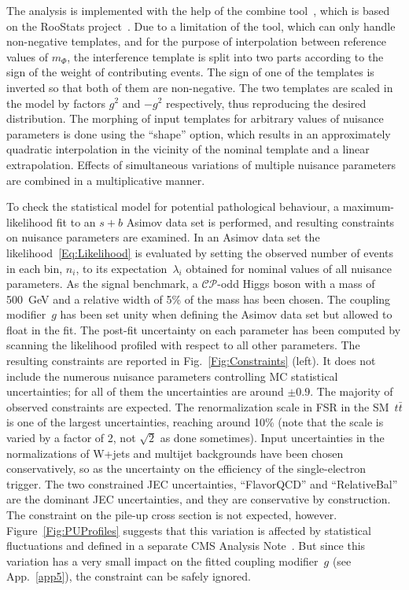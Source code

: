 The analysis is implemented with the help of the combine tool~\cite{Wiki:Combine}, which is based on the RooStats project~\cite{RooStats}.
Due to a limitation of the tool, which can only handle non-negative templates, and for the purpose of interpolation between reference values of $m_\Phi$, the interference template is split into two parts according to the sign of the weight of contributing events.
The sign of one of the templates is inverted so that both of them are non-negative.
The two templates are scaled in the model by factors $g^2$ and $-g^2$ respectively, thus reproducing the desired distribution.
The morphing of input templates for arbitrary values of nuisance parameters is done using the ``shape'' option, which results in an approximately quadratic interpolation in the vicinity of the nominal template and a linear extrapolation.
Effects of simultaneous variations of multiple nuisance parameters are combined in a multiplicative manner.

To check the statistical model for potential pathological behaviour, a maximum-likelihood fit to an $s+b$ Asimov data set is performed, and resulting constraints on nuisance parameters are examined.
In an Asimov data set the likelihood~\eqref{Eq:Likelihood} is evaluated by setting the observed number of events in each bin, $n_i$, to its expectation~$\lambda_i$ obtained for nominal values of all nuisance parameters.
As the signal benchmark, a $\mathcal{CP}$-odd Higgs boson with a mass of 500~GeV and a relative width of 5\% of the mass has been chosen.
The coupling modifier~$g$ has been set unity when defining the Asimov data set but allowed to float in the fit.
The post-fit uncertainty on each parameter has been computed by scanning the likelihood profiled with respect to all other parameters.
The resulting constraints are reported in Fig.~\ref{Fig:Constraints} (left).
It does not include the numerous nuisance parameters controlling MC statistical uncertainties; for all of them the uncertainties are around $\pm 0.9$.
The majority of observed constraints are expected.
The renormalization scale in FSR in the SM~$t\bar{t}$ is one of the largest uncertainties, reaching around 10\% (note that the scale is varied by a factor of 2, not $\sqrt{2}$ as done sometimes).
Input uncertainties in the normalizations of W+jets and multijet backgrounds have been chosen conservatively, so as the uncertainty on the efficiency of the single-electron trigger.
The two constrained JEC uncertainties, ``FlavorQCD'' and ``RelativeBal'' are the dominant JEC uncertainties, and they are conservative by construction.
The constraint on the pile-up cross section is not expected, however.
Figure~\ref{Fig:PUProfiles} suggests that this variation is affected by statistical fluctuations and defined in a separate CMS Analysis Note~\cite{CMS-AN-18-077}. 
But since this variation has a very small impact on the fitted coupling modifier~$g$ (see App.~\ref{app5}), the constraint can be safely ignored.

